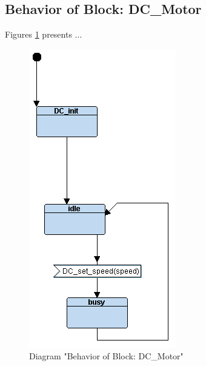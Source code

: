 \subsection{Behavior of Block: DC\_Motor}
Figures \ref{fig:DCMotorDCMotor04} presents ...
\begin{figure}[htb]
\centering
\includegraphics[width=\textwidth]{img_0_4.png}
\caption{Diagram "Behavior of Block: DC\_Motor"}
\label{fig:DCMotorDCMotor04}
\end{figure}

